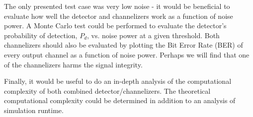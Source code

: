 \documentclass[12pt]{article}
\begin{document}
The only presented test case was very low noise - it would be beneficial to
evaluate how well the detector and channelizers work as a function of noise
power. A Monte Carlo test could be performed to evaluate the detector's
probability of detection, $P_d$, vs. noise power at a given threshold. Both
channelizers should also be evaluated by plotting the Bit Error Rate (BER) of
every output channel as a function of noise power. Perhaps we will find that
one of the channelizers harms the signal integrity.

Finally, it would be useful to do an in-depth analysis of the computational
complexity of both combined detector/channelizers. The theoretical
computational complexity could be determined in addition to an analysis of
simulation runtime.


%
%

%



\nocite{*}


%

\end{document}
